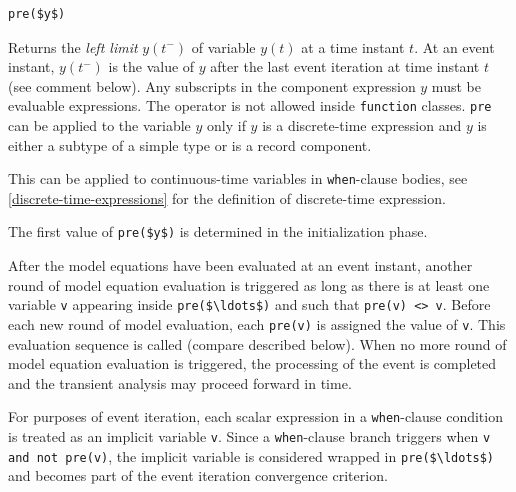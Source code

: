 \begin{operatordefinition}[pre]
\begin{synopsis}\begin{lstlisting}
pre($y$)
\end{lstlisting}\end{synopsis}
\begin{semantics}
Returns the \emph{left limit} $y(t^{-})$ of variable $y(t)$ at a time instant $t$.
At an event instant, $y(t^{-})$ is the value of $y$ after the last event iteration at time instant $t$ (see comment below).
Any subscripts in the component expression $y$ must be evaluable expressions.
The operator is not allowed inside \lstinline!function! classes.
\lstinline!pre! can be applied to the variable $y$ only if $y$ is a discrete-time expression and $y$ is either a subtype of a simple type or is a record component.
\begin{nonnormative}
This can be applied to continuous-time variables in \lstinline!when!-clause bodies, see \cref{discrete-time-expressions} for the definition of discrete-time expression.
\end{nonnormative}
The first value of \lstinline!pre($y$)! is determined in the initialization phase.

After the model equations have been evaluated at an event instant, another round of model equation evaluation is triggered as long as there is at least one variable \lstinline!v! appearing inside \lstinline!pre($\ldots$)! and such that \lstinline!pre(v) <> v!.
Before each new round of model evaluation, each \lstinline!pre(v)! is assigned the value of \lstinline!v!.
This evaluation sequence is called  (compare  described below).
When no more round of model equation evaluation is triggered, the processing of the event is completed and the transient analysis may proceed forward in time.

For purposes of event iteration, each scalar expression in a \lstinline!when!-clause condition is treated as an implicit variable \lstinline!v!.
Since a \lstinline!when!-clause branch triggers when \lstinline!v and not pre(v)!, the implicit variable is considered wrapped in \lstinline!pre($\ldots$)! and becomes part of the event iteration convergence criterion.


\end{semantics}
\end{operatordefinition}
